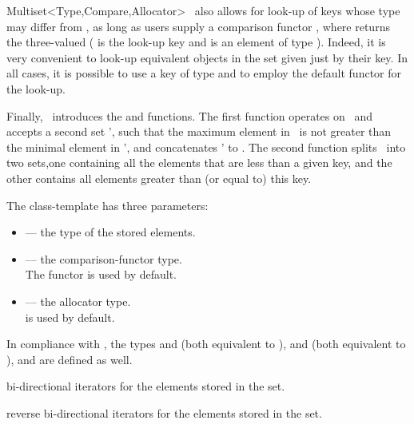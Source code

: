 \begin{ccRefClass}{Multiset<Type,Compare,Allocator>}
\ccRefName\ also allows for look-up of keys whose type may differ from
, as long as users supply a comparison functor ,
where  returns the three-valued
 ( is the look-up key and  is an
element of type ). Indeed, it is very convenient to look-up
equivalent objects in the set given just by their key. In all cases, it is
possible to use a key of type  and to employ the default
 functor for the look-up.

\begin{ccAdvanced}

Finally, \ccRefName\ introduces the  and 
functions. The first function operates on \ccVar\ and accepts a second
set \ccVar', such that the maximum element in \ccVar\ is not greater than
the minimal element in \ccVar', and concatenates \ccVar' to \ccVar. The
second function splits \ccVar\ into two sets,one containing all the
elements that are less than a given key, and the other contains all
elements greater than (or equal to) this key.

\end{ccAdvanced}

\ccParameters

The  class-template has three parameters:
\begin{itemize}
\item {} --- the type of the stored elements.
\item {} --- the comparison-functor type. \\
    The  functor is used by default.
\item {} --- the allocator type. \\
     is used by default.
\end{itemize}


\ccTypes

In compliance with \stl, the types  and 
(both equivalent to ),  and 
(both equivalent to ), and  are defined as well.

\ccGlue
{}
{bi-directional iterators for the elements stored in the set.}

\ccGlue
{}
{reverse bi-directional iterators for the elements stored in the set.}


\end{ccRefClass}
